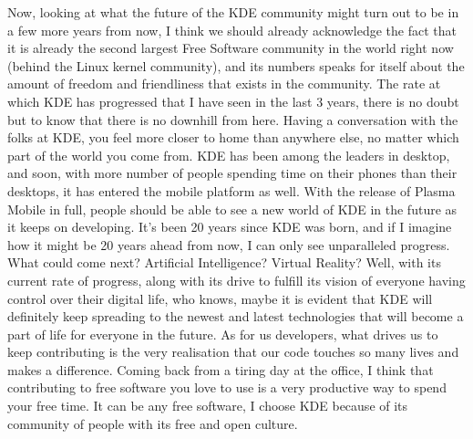 Now, looking at what the future of the KDE community might turn out to be in a few more years from now, I think we should already acknowledge the fact that it is already the second largest Free Software community in the world right now (behind the Linux kernel community), and its numbers speaks for itself about the amount of freedom and friendliness that exists in the community. The rate at which KDE has progressed that I have seen in the last 3 years, there is no doubt but to know that there is no downhill from here. Having a conversation with the folks at KDE, you feel more closer to home than anywhere else, no matter which part of the world you come from. KDE has been among the leaders in desktop, and soon, with more number of people spending time on their phones than their desktops, it has entered the mobile platform as well. With the release of Plasma Mobile in full, people should be able to see a new world of KDE in the future as it keeps on developing. It's been 20 years since KDE was born, and if I imagine how it might be 20 years ahead from now, I can only see unparalleled progress. What could come next? Artificial Intelligence? Virtual Reality? Well, with its current rate of progress, along with its drive to fulfill its vision of everyone having control over their digital life, who knows, maybe it is evident that KDE will definitely keep spreading to the newest and latest technologies that will become a part of life for everyone in the future. As for us developers, what drives us to keep contributing is the very realisation that our code touches so many lives and makes a difference. Coming back from a tiring day at the office, I think that contributing to free software you love to use is a very productive way to spend your free time. It can be any free software, I choose KDE because of its community of people with its free and open culture.
